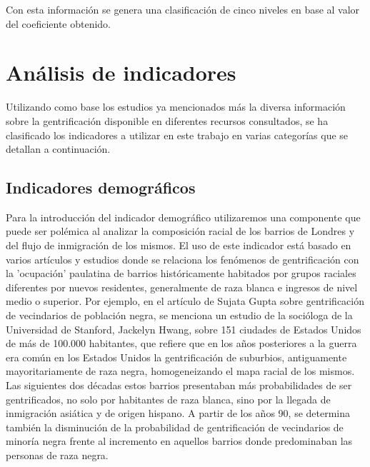 \documentclass[12pt,a4paper,twoside]{book}
\begin{document}
Con esta información se genera una clasificación de cinco niveles en base al valor del coeficiente obtenido.

\section{Análisis de indicadores}

Utilizando como base los estudios ya mencionados más la diversa información sobre la gentrificación disponible en diferentes recursos consultados, se ha clasificado los indicadores a utilizar en este trabajo en varias categorías que se detallan a continuación.

\subsection{Indicadores demográficos}

Para la introducción del indicador demográfico utilizaremos una componente que puede ser polémica al analizar la composición racial de los barrios de Londres y del flujo de inmigración de los mismos. El uso de este indicador está basado en varios artículos y estudios donde se relaciona los fenómenos de gentrificación con la 'ocupación' paulatina de barrios históricamente habitados por grupos raciales diferentes por nuevos residentes, generalmente de raza blanca e ingresos de nivel medio o superior. Por ejemplo, en el artículo de Sujata Gupta \cite{gupta_immigrants_2019} sobre gentrificación de vecindarios de población negra, se menciona un estudio de la socióloga de la Universidad de Stanford, Jackelyn Hwang, sobre 151 ciudades de Estados Unidos de más de 100.000 habitantes, que refiere que en los años posteriores a la guerra era común en los Estados Unidos la gentrificación de suburbios, antiguamente mayoritariamente de raza negra, homogeneizando el mapa racial de los mismos. Las siguientes dos décadas estos barrios presentaban más probabilidades de ser gentrificados, no solo por habitantes de raza blanca, sino por la llegada de inmigración asiática y de origen hispano. A partir de los años 90, se determina también la disminución de la probabilidad de gentrificación de vecindarios de minoría negra frente al incremento en aquellos barrios donde predominaban las personas de raza negra.
\end{document}
